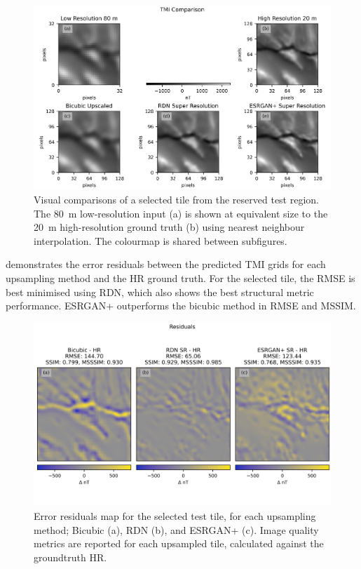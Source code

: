 \documentclass[manuscript.tex]{subfiles}
\begin{document}
\begin{figure}[hbt]
    \includegraphics[width=\linewidth,trim={0 0 0 5mm},clip]{fig/p1/resultsvis.png}
    \caption[Visual inference results]{Visual comparisons of a selected tile from the reserved test region.
        The \SI{80}{\metre} low-resolution input (a) is shown at equivalent size to the \SI{20}{\metre} high-resolution ground truth (b) using nearest neighbour interpolation.
        The colourmap is shared between subfigures.
    }
    \label{fig:resultsvis}
\end{figure}

 demonstrates the error residuals between the predicted TMI grids for each upsampling method and the HR ground truth.
For the selected tile, the RMSE is best minimised using RDN\textdaggerdbl{}, which also shows the best structural metric performance.
ESRGAN+ outperforms the bicubic method in RMSE and MSSIM\@.

\begin{figure}[hbt]
    \includegraphics[width=\linewidth,trim={0 10mm 0 5mm},clip]{fig/p1/residuals.png}
    \caption[Error residuals map for a selected tile]{Error residuals map for the selected test tile, for each upsampling method; Bicubic (a), RDN\textdaggerdbl{} (b), and ESRGAN+ (c).
        Image quality metrics are reported for each upsampled tile, calculated against the groundtruth HR\@.}
    \label{fig:residuals}
\end{figure}
\end{document}
